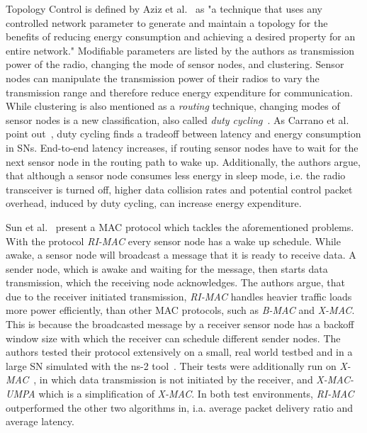 Topology Control is defined by Aziz et al.~\cite{aziz2013survey} as "a
technique that uses any controlled network parameter to generate and maintain a
topology for the benefits of reducing energy consumption and achieving a
desired property for an entire network." Modifiable parameters are listed by
the authors as transmission power of the radio, changing the mode of sensor
nodes, and clustering. Sensor nodes can manipulate the transmission power of
their radios to vary the transmission range and therefore reduce energy
expenditure for communication. While clustering is also mentioned as a
\textit{routing} technique, changing modes of sensor nodes is a new
classification, also called \textit{duty cycling}~\cite{carrano2014survey,
lin2004medium, buettner2006x}. As Carrano et al. point
out~\cite{carrano2014survey}, duty cycling finds a tradeoff between latency and
energy consumption in \acp{SN}. End-to-end latency increases, if routing sensor
nodes have to wait for the next sensor node in the routing path to wake up.
Additionally, the authors argue, that although a sensor node consumes less
energy in sleep mode, i.e. the radio transceiver is turned off, higher data
collision rates and potential control packet overhead, induced by duty cycling,
can increase energy expenditure.

Sun et al.~\cite{sun2008ri} present a \ac{MAC} protocol which tackles the
aforementioned problems. With the protocol \textit{RI-MAC} every sensor node
has a wake up schedule. While awake, a sensor node will broadcast a message
that it is ready to receive data. A sender node, which is awake and waiting for
the message, then starts data transmission, which the receiving node
acknowledges. The authors argue, that due to the receiver initiated
transmission, \textit{RI-MAC} handles heavier traffic loads more power
efficiently, than other \ac{MAC} protocols, such as \textit{B-MAC} and
\textit{X-MAC}. This is because the broadcasted message by a receiver sensor
node has a backoff window size with which the receiver can schedule different
sender nodes. The authors tested their protocol extensively on a small, real
world testbed and in a large \ac{SN} simulated with the ns-2
tool~\cite{bajaj1999improving}. Their tests were additionally run on
\textit{X-MAC}~\cite{buettner2006x}, in which data transmission is not
initiated by the receiver, and \textit{X-MAC-UMPA} which is a simplification of
\textit{X-MAC}. In both test environments, \textit{RI-MAC} outperformed the
other two algorithms in, i.a. average packet delivery ratio and average
latency.

